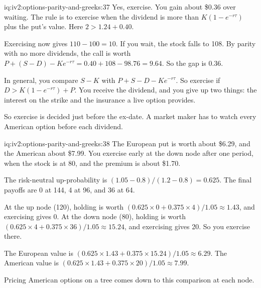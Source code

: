 \begin{solution}{iq:iv2:options-parity-and-greeks:37}
Yes, exercise. You gain about \$0.36 over waiting. The rule is to exercise when the dividend is more than $K(1 - e^{-r\tau})$ plus the put's value. Here $2 > 1.24 + 0.40$.

Exercising now gives $110 - 100 = 10$. If you wait, the stock falls to 108. By parity with no more dividends, the call is worth $P + (S - D) - Ke^{-r\tau} = 0.40 + 108 - 98.76 = 9.64$. So the gap is 0.36.

In general, you compare $S - K$ with $P + S - D - Ke^{-r\tau}$. So exercise if $D > K(1 - e^{-r\tau}) + P$. You receive the dividend, and you give up two things: the interest on the strike and the insurance a live option provides.

So exercise is decided just before the ex-date. A market maker has to watch every American option before each dividend.

\end{solution}

\begin{solution}{iq:iv2:options-parity-and-greeks:38}
The European put is worth about \$6.29, and the American about \$7.99. You exercise early at the down node after one period, when the stock is at 80, and the premium is about \$1.70.

The risk-neutral up-probability is $(1.05 - 0.8)/(1.2 - 0.8) = 0.625$. The final payoffs are 0 at 144, 4 at 96, and 36 at 64.

At the up node (120), holding is worth $(0.625 \times 0 + 0.375 \times 4)/1.05 \approx 1.43$, and exercising gives 0. At the down node (80), holding is worth $(0.625 \times 4 + 0.375 \times 36)/1.05 \approx 15.24$, and exercising gives 20. So you exercise there.

The European value is $(0.625 \times 1.43 + 0.375 \times 15.24)/1.05 \approx 6.29$. The American value is $(0.625 \times 1.43 + 0.375 \times 20)/1.05 \approx 7.99$.

Pricing American options on a tree comes down to this comparison at each node.

\end{solution}

